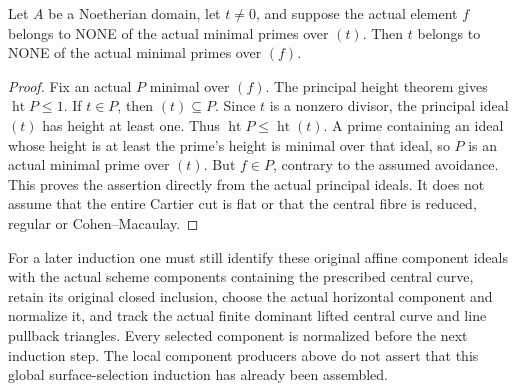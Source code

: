 \begin{lemma}
\label{lem:pl-gauss-central-parameter-avoids-cut-components}
\leanok
Let $A$ be a Noetherian domain, let $t\ne0$, and suppose the actual
element $f$ belongs to NONE of the actual minimal primes over $(t)$.
Then $t$ belongs to NONE of the actual minimal primes over $(f)$.
\end{lemma}
\begin{proof}
Fix an actual $P$ minimal over $(f)$. The principal height theorem gives
$\operatorname{ht}P\le1$. If $t\in P$, then $(t)\subseteq P$.
Since $t$ is a nonzero divisor, the principal ideal $(t)$ has height
at least one. Thus $\operatorname{ht}P\le\operatorname{ht}(t)$.
A prime containing an ideal whose height is at least the prime's
height is minimal over that ideal, so $P$ is an actual minimal prime
over $(t)$. But $f\in P$, contrary to the assumed avoidance. This
proves the assertion directly from the actual principal ideals. It
does not assume that the entire Cartier cut is flat or that the central
fibre is reduced, regular or Cohen--Macaulay.
\end{proof}

For a later induction one must still identify these original affine
component ideals with the actual scheme components containing the
prescribed central curve, retain its original closed inclusion, choose
the actual horizontal component and normalize it, and track the actual
finite dominant lifted central curve and line pullback triangles.
Every selected component is normalized before the next induction step.
The local component producers above do not assert that this global
surface-selection induction has already been assembled.
